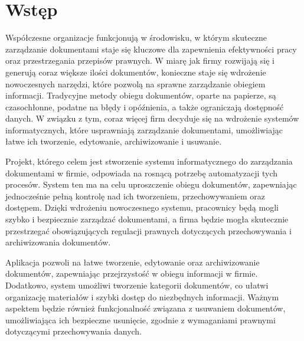 \chapter*{Wstęp}

Współczesne organizacje funkcjonują w środowisku, w którym skuteczne zarządzanie dokumentami staje się kluczowe dla zapewnienia efektywności pracy oraz przestrzegania przepisów prawnych. W miarę jak firmy rozwijają się i generują coraz większe ilości dokumentów, konieczne staje się wdrożenie nowoczesnych narzędzi, które pozwolą na sprawne zarządzanie obiegiem informacji. Tradycyjne metody obiegu dokumentów, oparte na papierze, są czasochłonne, podatne na błędy i opóźnienia, a także ograniczają dostępność danych. W związku z tym, coraz więcej firm decyduje się na wdrożenie systemów informatycznych, które usprawniają zarządzanie dokumentami, umożliwiając łatwe ich tworzenie, edytowanie, archiwizowanie i usuwanie.

Projekt, którego celem jest stworzenie systemu informatycznego do zarządzania dokumentami w firmie, odpowiada na rosnącą potrzebę automatyzacji tych procesów. System ten ma na celu uproszczenie obiegu dokumentów, zapewniając jednocześnie pełną kontrolę nad ich tworzeniem, przechowywaniem oraz dostępem. Dzięki wdrożeniu nowoczesnego systemu, pracownicy będą mogli szybko i bezpiecznie zarządzać dokumentami, a firma będzie mogła skutecznie przestrzegać obowiązujących regulacji prawnych dotyczących przechowywania i archiwizowania dokumentów.

Aplikacja pozwoli na łatwe tworzenie, edytowanie oraz archiwizowanie dokumentów, zapewniając przejrzystość w obiegu informacji w firmie. Dodatkowo, system umożliwi tworzenie kategorii dokumentów, co ułatwi organizację materiałów i szybki dostęp do niezbędnych informacji. Ważnym aspektem będzie również funkcjonalność związana z usuwaniem dokumentów, umożliwiająca ich bezpieczne usunięcie, zgodnie z wymaganiami prawnymi dotyczącymi przechowywania danych.
